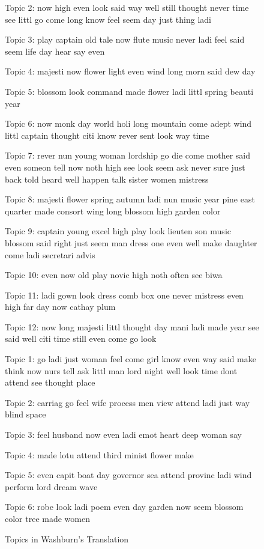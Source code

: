 \documentclass[12pt]{article}
\begin{document}
\begin{flushleft}
\begin{spacing}{2.0}
\begin{figure}
Topic 2: now high even look said way well still thought never time see littl go come long know feel seem day just thing ladi 

Topic 3: play captain old tale now flute music never ladi feel said seem life day hear say even 

Topic 4: majesti now flower light even wind long morn said dew day 

Topic 5: blossom look command made flower ladi littl spring beauti year 

Topic 6: now monk day world holi long mountain come adept wind littl captain thought citi know rever sent look way time 

Topic 7: rever nun young woman lordship go die come mother said even someon tell now noth high see look seem ask never sure just back told heard well happen talk sister women mistress 

Topic 8: majesti flower spring autumn ladi nun music year pine east quarter made consort wing long blossom high garden color 

Topic 9: captain young excel high play look lieuten son music blossom said right just seem man dress one even well make daughter come ladi secretari advis 

Topic 10: even now old play novic high noth often see biwa 

Topic 11: ladi gown look dress comb box one never mistress even high far day now cathay plum 

Topic 12: now long majesti littl thought day mani ladi made year see said well citi time still even come go look 
\end{figure}


\begin{figure}
\caption{Topics in Washburn's Translation}
\label{washburn-topics}
\singlespacing
\small
Topic 1: go ladi just woman feel come girl know even way said make think now nurs tell ask littl man lord night well look time dont attend see thought place 

Topic 2: carriag go feel wife process men view attend ladi just way blind space 

Topic 3: feel husband now even ladi emot heart deep woman say 

Topic 4: made lotu attend third minist flower make 

Topic 5: even capit boat day governor sea attend provinc ladi wind perform lord dream wave 

Topic 6: robe look ladi poem even day garden now seem blossom color tree made women 


\end{figure}
\end{spacing}
\end{flushleft}
\end{document}
